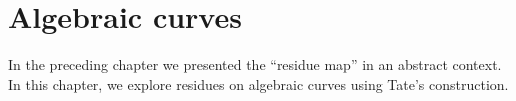 \chapter{Algebraic curves}\label{ch:algebraic-curves}
In the preceding chapter we presented the ``residue map'' in an abstract context. In this chapter, we explore residues on algebraic curves using Tate's construction. 

